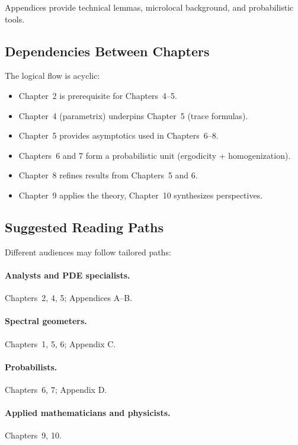 Appendices provide technical lemmas, microlocal background, and probabilistic
tools.

\subsection{Dependencies Between Chapters}

The logical flow is acyclic:

\begin{itemize}
  \item Chapter~2 is prerequisite for Chapters~4–5.
  \item Chapter~4 (parametrix) underpins Chapter~5 (trace formulas).
  \item Chapter~5 provides asymptotics used in Chapters~6–8.
  \item Chapters~6 and 7 form a probabilistic unit (ergodicity + homogenization).
  \item Chapter~8 refines results from Chapters~5 and 6.
  \item Chapter~9 applies the theory, Chapter~10 synthesizes perspectives.
\end{itemize}

\subsection{Suggested Reading Paths}

Different audiences may follow tailored paths:

\paragraph{Analysts and PDE specialists.}
Chapters~2, 4, 5; Appendices A–B.

\paragraph{Spectral geometers.}
Chapters~1, 5, 6; Appendix C.

\paragraph{Probabilists.}
Chapters~6, 7; Appendix D.

\paragraph{Applied mathematicians and physicists.}
Chapters~9, 10.

